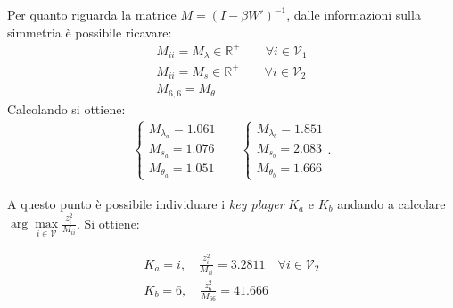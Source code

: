 \begin{alphaparts}
  Per quanto riguarda la matrice \(M = (I- \beta W')^{-1}\), dalle informazioni sulla simmetria è possibile ricavare:
  \begin{gather*}
      M_{ii} = M_\lambda \in \mathbb{R}^+\quad\quad \forall i \in \mathcal{V}_1\\
      M_{ii} = M_s \in \mathbb{R}^+ \quad\quad \forall i \in \mathcal{V}_2\\
      M_{6,6} = M_\theta
      \end{gather*}
    Calcolando si ottiene:
    \begin{align*}
        \begin{cases}
          M_{\lambda_a} = 1.061 \\
          M_{s_a} = 1.076 \\
          M_{\theta_a }= 1.051
        \end{cases} && \begin{cases}
          M_{\lambda_b} = 1.851 \\
          M_{s_b} = 2.083 \\
          M_{\theta_b} = 1.666
        \end{cases}.
      \end{align*}

      A questo punto è possibile individuare i \textit{key player} \(K_a\) e \(K_b\) andando a calcolare \(\arg\max \limits_{i \in \mathcal{V}} \frac{z_i^2}{M_{ii}}\).  Si ottiene:
      
      \begin{gather*}
          K_a = i ,\quad   \frac{z_i^2}{M_{ii}} = 3.2811\quad \forall i \in \mathcal{V}_2 \\
          K_b = 6,\quad \frac{z_6^2}{M_{66}} = 41.666  
      \end{gather*}
      
\end{alphaparts}